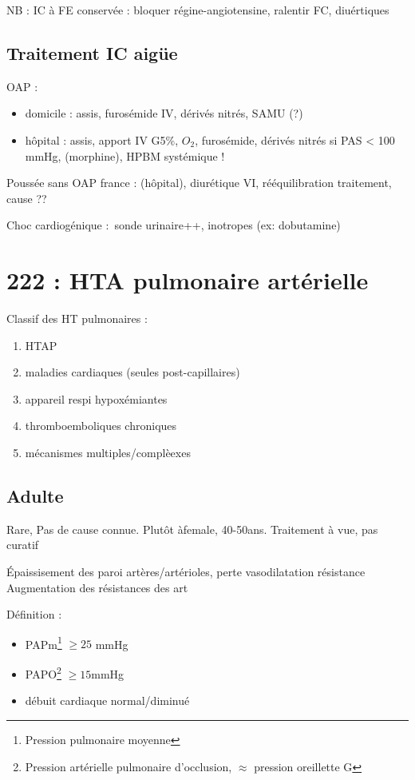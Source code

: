 \documentclass{article}
\begin{document}
NB : IC à FE conservée : bloquer régine-angiotensine, ralentir FC, diuértiques

\subsection{Traitement IC aigüe}
OAP : 
\begin{itemize}
  \item domicile : assis, furosémide IV, dérivés nitrés, SAMU (?)
  \item hôpital : assis, apport IV G5\%, $O_2$, furosémide, dérivés nitrés si
    PAS < 100 mmHg, (morphine), HPBM systémique !
\end{itemize}
Poussée sans OAP france : (hôpital), diurétique VI, rééquilibration traitement,
cause ??

Choc cardiogénique : sonde urinaire++, inotropes (ex: dobutamine)

\section{222 : HTA pulmonaire artérielle}%
\label{sec:hta_pulmonaire_arterielle}

Classif des HT pulmonaires : 
\begin{enumerate}
  \item HTAP
  \item maladies cardiaques (seules post-capillaires)
  \item appareil respi \lor{} hypoxémiantes
  \item thromboemboliques chroniques
  \item mécanismes multiples/complèexes
\end{enumerate}
\subsection{Adulte}
Rare, Pas de cause connue. Plutôt àfemale, 40-50ans. Traitement à vue, pas curatif

Épaissisement des paroi artères/artérioles, perte vasodilatation \thus \inc résistance
Augmentation des résistances des art

Définition : 
\begin{itemize}
  \item PAPm\footnote{Pression pulmonaire moyenne} $\ge 25$ mmHg 
  \item PAPO\footnote{Pression artérielle pulmonaire d'occlusion, $\approx$ pression
oreillette G} $\ge 15$mmHg
\item débuit cardiaque normal/diminué
\end{itemize}
\end{document}
